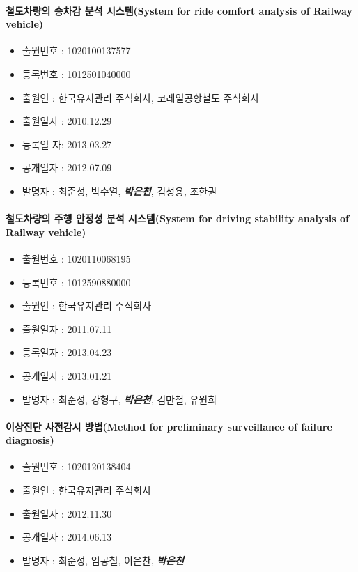 \documentclass[]{article}
\providecommand{\tightlist}{%
  \setlength{\itemsep}{0pt}\setlength{\parskip}{0pt}}
\let\oldparagraph\paragraph
\renewcommand{\paragraph}[1]{\oldparagraph{#1}\mbox{}}
\begin{document}
\paragraph{철도차량의 승차감 분석 시스템(System for ride comfort
analysis of Railway
vehicle)}

\begin{itemize}
\tightlist
\item
  출원번호 : 1020100137577
\item
  등록번호 : 1012501040000
\item
  출원인 : 한국유지관리 주식회사, 코레일공항철도 주식회사
\item
  출원일자 : 2010.12.29
\item
  등록일 자: 2013.03.27
\item
  공개일자 : 2012.07.09
\item
  발명자 : 최준성, 박수열, \emph{\textbf{박은천}}, 김성용, 조한권
\end{itemize}

\paragraph{철도차량의 주행 안정성 분석 시스템(System for driving
stability analysis of Railway
vehicle)}

\begin{itemize}
\tightlist
\item
  출원번호 : 1020110068195
\item
  등록번호 : 1012590880000
\item
  출원인 : 한국유지관리 주식회사
\item
  출원일자 : 2011.07.11
\item
  등록일자 : 2013.04.23
\item
  공개일자 : 2013.01.21
\item
  발명자 : 최준성, 강형구, \emph{\textbf{박은천}}, 김만철, 유원희
\end{itemize}

\paragraph{이상진단 사전감시 방법(Method for preliminary surveillance of
failure
diagnosis)}

\begin{itemize}
\tightlist
\item
  출원번호 : 1020120138404
\item
  출원인 : 한국유지관리 주식회사
\item
  출원일자 : 2012.11.30
\item
  공개일자 : 2014.06.13
\item
  발명자 : 최준성, 임공철, 이은찬, \emph{\textbf{박은천}}
\end{itemize}
\end{document}
